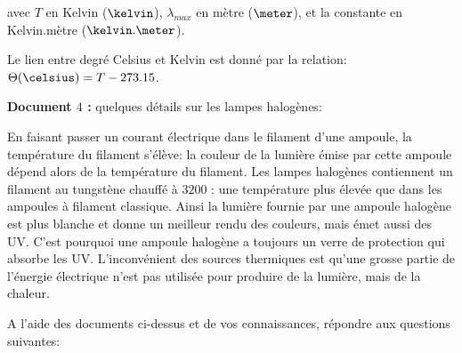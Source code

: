 avec $T$ en Kelvin ($\kelvin$), $\lambda_{max}$ en mètre ($\meter$), et la constante en Kelvin.mètre ($\kelvin.\meter$).

\vspace{0.3cm}

Le lien entre degré Celsius et Kelvin est donné par la relation: $\Theta(\celsius) = T - 273.15$.

\vspace{0.3cm}

\textbf{Document $4$ :} quelques détails sur les lampes halogènes:

\vspace{0.3cm}

En faisant passer un courant électrique dans le filament d'une ampoule, la température du filament s'élève: la couleur de la lumière émise par cette ampoule dépend alors de la température du filament.\newline
Les lampes halogènes contiennent un filament au tungstène chauffé à $3200$ \kelvin : une température plus élevée que dans les ampoules à filament classique. Ainsi la lumière fournie par une ampoule halogène est plus blanche et donne un meilleur rendu des couleurs, mais émet aussi des UV. C'est pourquoi une ampoule
halogène a toujours un verre de protection qui absorbe les UV.\newline
L'inconvénient des sources thermiques est qu'une grosse partie de l'énergie électrique n'est pas utilisée
pour produire de la lumière, mais de la chaleur.


\newpage

A l'aide des documents ci-dessus et de vos connaissances, répondre aux questions suivantes:


